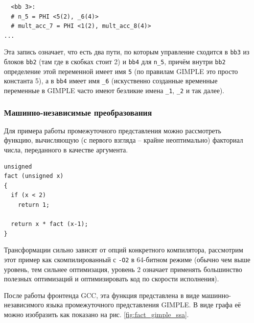 \documentclass[a4paper,12pt,oneside]{article}
\begin{document}
\begin{lstlisting}
  <bb 3>:
  # n_5 = PHI <5(2), _6(4)>
  # mult_acc_7 = PHI <1(2), mult_acc_8(4)>
...
\end{lstlisting}

Эта запись означает, что есть два пути, по которым управление сходится в \lstinline!bb3! из блоков \lstinline!bb2! (там где в скобках стоит 2) и \lstinline!bb4! для \lstinline!n_5!, причём внутри \lstinline!bb2! определение этой переменной имеет имя \lstinline!5! (по правилам GIMPLE это просто константа 5), а в \lstinline!bb4! имеет имя \lstinline!_6! (искуственно созданные временные переменные в GIMPLE часто имеют безликие имена \lstinline!_1!, \lstinline!_2! и так далее).

\subsubsection{Машинно-независимые преобразования}\label{subsubsec:MITrans}

Для примера работы промежуточного представления можно рассмотреть функцию, вычисляющую (с первого взгляда -- крайне неоптимально) факториал числа, переданного в качестве аргумента.

\begin{lstlisting}
unsigned
fact (unsigned x)
{
  if (x < 2)
    return 1;

  return x * fact (x-1);
}
\end{lstlisting}

Трансформации сильно зависят от опций конкретного компилятора, рассмотрим этот пример как скомпилированный с \lstinline!-O2! в 64-битном режиме (обычно чем выше уровень, тем сильнее оптимизация, уровень 2 означает применять большинство полезных оптимизаций и оптимизировать код по скорости исполнения).

После работы фронтенда GCC, эта функция представлена в виде машинно-независимого языка промежуточного представления GIMPLE. В виде графа её можно изобразить как показано на рис. \ref{fig:fact_gimple_ssa}.
\end{document}
